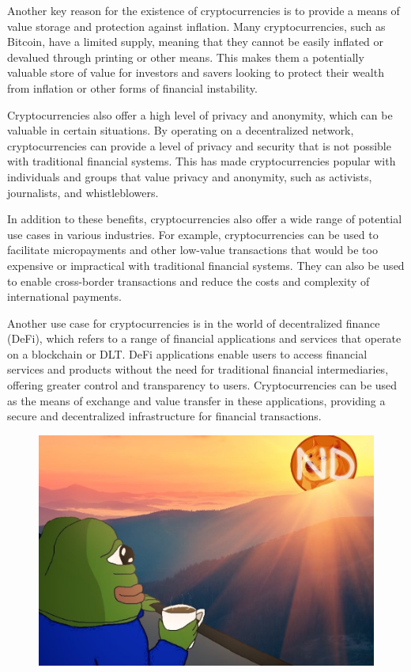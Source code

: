\documentclass[a4paper, 10pt]{article}
\begin{document}
Another key reason for the existence of cryptocurrencies is to provide a means of value storage and protection against inflation. Many cryptocurrencies, such as Bitcoin, have a limited supply, meaning that they cannot be easily inflated or devalued through printing or other means. This makes them a potentially valuable store of value for investors and savers looking to protect their wealth from inflation or other forms of financial instability.

Cryptocurrencies also offer a high level of privacy and anonymity, which can be valuable in certain situations. By operating on a decentralized network, cryptocurrencies can provide a level of privacy and security that is not possible with traditional financial systems. This has made cryptocurrencies popular with individuals and groups that value privacy and anonymity, such as activists, journalists, and whistleblowers.

In addition to these benefits, cryptocurrencies also offer a wide range of potential use cases in various industries. For example, cryptocurrencies can be used to facilitate micropayments and other low-value transactions that would be too expensive or impractical with traditional financial systems. They can also be used to enable cross-border transactions and reduce the costs and complexity of international payments.

Another use case for cryptocurrencies is in the world of decentralized finance (DeFi), which refers to a range of financial applications and services that operate on a blockchain or DLT. DeFi applications enable users to access financial services and products without the need for traditional financial intermediaries, offering greater control and transparency to users. Cryptocurrencies can be used as the means of exchange and value transfer in these applications, providing a secure and decentralized infrastructure for financial transactions.

\begin{figure}[!h]
  \centering
  \includegraphics[width=0.75\linewidth]{4.jpg}
  \end{figure}
\end{document}
